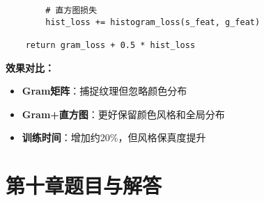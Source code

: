 \documentclass[a4paper,12pt]{book}
\begin{document}
\begin{enumerate}[label=\arabic*.]
\begin{verbatim}
        # 直方图损失
        hist_loss += histogram_loss(s_feat, g_feat)
    
    return gram_loss + 0.5 * hist_loss
    \end{verbatim}
    
    \textbf{效果对比：}
    \begin{itemize}
        \item \textbf{Gram矩阵}：捕捉纹理但忽略颜色分布
        \item \textbf{Gram+直方图}：更好保留颜色风格和全局分布
        \item \textbf{训练时间}：增加约20\%，但风格保真度提升
    \end{itemize}
\end{enumerate}
\section*{第十章题目与解答}
\end{document}

